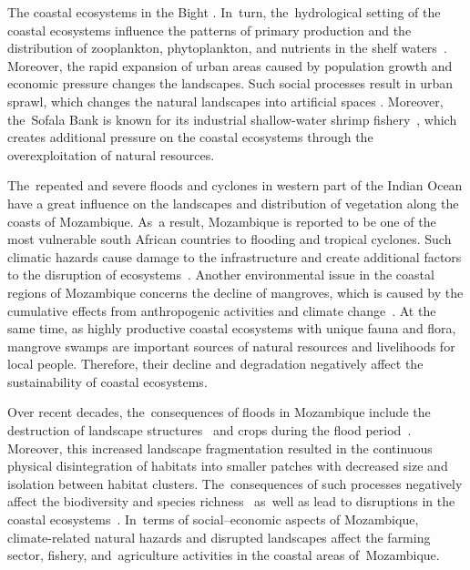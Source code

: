 \documentclass[coasts,article,accept,pdftex,oneauthor]{Definitions/mdpi}
\begin{document}
{The coastal ecosystems in the} Bight . In~turn, the~hydrological setting of the coastal ecosystems influence {the patterns of }primary production and the  distribution of zooplankton, phytoplankton, and nutrients in the {shelf} waters~\cite{MALAUENE2021107268}. Moreover, the rapid expansion of {urban} areas {caused by} population {growth }and economic pressure{ changes the landscapes}{. Such social processes }{result} in {urban sprawl, which changes the }natural landscapes {into artificial spaces }\cite{JOKARARSANJANI201838}. Moreover, the~Sofala Bank is known for its industrial shallow-water shrimp fishery~\cite{SOUSA2006207,MIGUEL2003365,GAMMELSROD199291}, which creates additional pressure on the coastal ecosystems through{ }the overexploitation of natural resources. 

{The}~repeated and severe floods and cyclones in{ }western part of the Indian Ocean have a great influence on{ }the landscapes and {distribution of }vegetation {along the coasts of} Mozambique. As~a result, Mozambique is reported to be one of the most vulnerable south African countries{{ }to} flooding and tropical cyclones{. Such climatic hazards }cause{ }damage to {the }infrastructure and {create additional factors to the disruption of }ecosystems~\cite{NHANGUMBE2023101015,SALVUCCI2020106713,Gall}. {Another{ }}environmental {issue in} the coastal {regions} of Mozambique {concerns }the decline of mangroves, {{which} is caused by the cumulative effects from }anthropogenic activities and climate change~\cite{COME2023106813}. {At the same time, }{as }highly productive coastal ecosystems with unique fauna and flora{, }mangrove swamps are important sources of natural resources and livelihoods for local {people}. Therefore, their decline and degradation negatively affect the sustainability of coastal ecosystems{.}

{Over{ }recent decades, the~}consequences of floods in Mozambique include the destruction of landscape structures~\cite{FICHTNER2023103329}{ }{and} crops during the flood{ }{period}~\cite{BOFANA2022112808}. {Moreover, this increased }landscape fragmentation {resulted in the continuous physical disintegration of habitats into smaller patches with decreased}{ }size and isolation {between{ }habitat clusters. The~consequences of such processes negatively affect the }biodiversity and species richness~\cite{Guldemond}{ }as~well as lead to disruptions in the coastal ecosystems~\cite{RAMAYANTI20221025}. In~terms of social--economic aspects of Mozambique, climate-related natural hazards and disrupted landscapes affect the farming sector, fishery{, }and~agriculture activities in the coastal {areas} of~Mozambique. 
\end{document}
